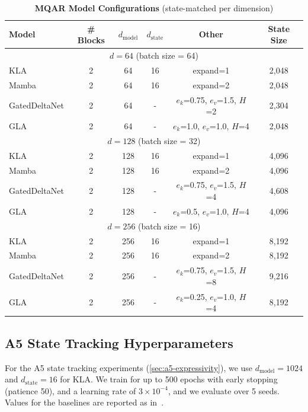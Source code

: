 \documentclass{article}
\newcommand{\our}{\textsc{KLA}\xspace}
\begin{document}
\begin{table}[h]
\caption{\textbf{MQAR Model Configurations} (state-matched per dimension)}
\label{tab:mqar-model-configs}
\begin{center}
\begin{small}
\begin{tabular}{lccccc}
\toprule
\textbf{Model} & \textbf{\# Blocks} & $d_{\text{model}}$ & $d_{\text{state}}$ & \textbf{Other} & \textbf{State Size} \\
\midrule
\multicolumn{6}{c}{$d=64$ (batch size = 64)} \\
\midrule
\our & 2 & 64 & 16 & expand=1 & 2,048 \\
Mamba & 2 & 64 & 16 & expand=2 & 2,048 \\
GatedDeltaNet & 2 & 64 & - & $e_k$=0.75, $e_v$=1.5, $H$=2 & 2,304 \\
GLA & 2 & 64 & - & $e_k$=1.0, $e_v$=1.0, $H$=4 & 2,048 \\
\midrule
\multicolumn{6}{c}{$d=128$ (batch size = 32)} \\
\midrule
\our & 2 & 128 & 16 & expand=1 & 4,096 \\
Mamba & 2 & 128 & 16 & expand=2 & 4,096 \\
GatedDeltaNet & 2 & 128 & - & $e_k$=0.75, $e_v$=1.5, $H$=4 & 4,608 \\
GLA & 2 & 128 & - & $e_k$=0.5, $e_v$=1.0, $H$=4 & 4,096 \\
\midrule
\multicolumn{6}{c}{$d=256$ (batch size = 16)} \\
\midrule
\our & 2 & 256 & 16 & expand=1 & 8,192 \\
Mamba & 2 & 256 & 16 & expand=2 & 8,192 \\
GatedDeltaNet & 2 & 256 & - & $e_k$=0.75, $e_v$=1.5, $H$=8 & 9,216 \\
GLA & 2 & 256 & - & $e_k$=0.25, $e_v$=1.0, $H$=4 & 8,192 \\
\bottomrule
\end{tabular}
\end{small}
\end{center}
\vskip -0.1in
\end{table}

\subsection{A5 State Tracking Hyperparameters}
\label{sec:a5-hyperparams}

For the A5 state tracking experiments (\cref{sec:a5-expressivity}), we use $d_{\text{model}} = 1024$ and $d_{\text{state}} = 16$ for \our. We train for up to 500 epochs with early stopping (patience 50), and a learning rate of $3 \times 10^{-4}$, and we evaluate over 5 seeds. Values for the baselines are reported as in~\citet{merrill2024illusion}.
\end{document}
